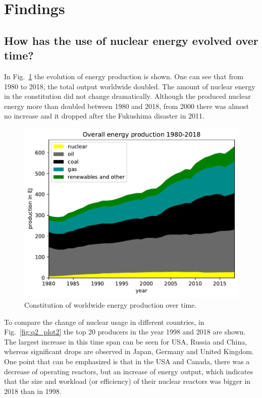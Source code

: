 \documentclass[a4paper,10pt,twocolumn]{scrartcl}
\begin{document}
\section{Findings}

\subsection{How has the use of nuclear energy evolved over time?}

In Fig.~\ref{fig:q1_plot1} the evolution of energy production is shown. One can see that from 1980 to 2018, the total output worldwide doubled. The amount of nuclear energy in the constitution did not change dramatically. Although the produced nuclear energy more than doubled between 1980 and 2018, from 2000 there was almost no increase and it dropped after the Fukushima disaster in 2011.

\begin{figure}[h]
	\centering
 	\includegraphics[width=\columnwidth]{../figures/q1_plot1.pdf}
 	\caption{Constitution of worldwide energy production over time.}
 	\label{fig:q1_plot1}
\end{figure}

To compare the change of nuclear usage in different countries, in Fig.~\ref{fig:q2_plot2} the top 20 producers in the year 1998 and 2018 are shown. The largest increase in this time span can be seen for USA, Russia and China, whereas significant drops are observed in Japan, Germany and United Kingdom. One point that can be emphasized is that in the USA and Canada, there was a decrease of operating reactors, but an increase of energy output, which indicates that the size and workload (or efficiency) of their nuclear reactors was bigger in 2018 than in 1998.
\end{document}

